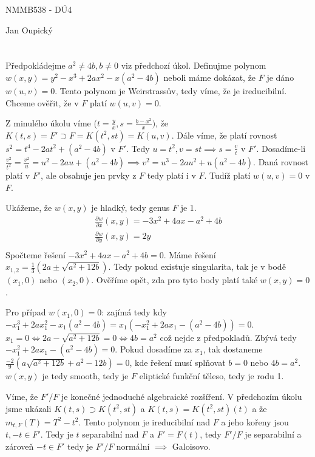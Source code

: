 \documentclass[12pt, a4paper]{article}
\begin{document}
\begin{center}
\large NMMB538 - DÚ4

\normalsize Jan Oupický
\end{center}
\vspace{1\baselineskip}

\section{}
Předpokládejme $a^2 \neq 4b, b \neq 0$ viz předchozí úkol. Definujme polynom $w(x,y) = y^2 - x^3 + 2ax^2 - x(a^2-4b)$ neboli máme dokázat, že $F$ je dáno $w(u,v)=0$. Tento polynom je Weirstrassův, tedy víme, že je ireducibilní. Chceme ověřit, že v $F$ platí $w(u,v)=0$.

Z minulého úkolu víme ($t=\frac{y}{x}, s=\frac{b-x^2}{x})$, že $K(t,s)=F' \supset F = K(t^2, st) = K(u,v)$. Dále víme, že platí rovnost $s^2 = t^4 - 2at^2 + (a^2-4b)$ v $F'$. Tedy $u = t^2, v = st \implies s = \frac{v}{t}$ v $F'$. Dosadíme-li $\frac{v^2}{t^2}=\frac{v^2}{u} = u^2-2au+(a^2-4b) \implies v^2 = u^3-2au^2+u(a^2-4b)$. Daná rovnost platí v $F'$, ale obsahuje jen prvky z $F$ tedy platí i v $F$. Tudíž platí $w(u,v)=0$ v $F$.

Ukážeme, že $w(x,y)$ je hladký, tedy genus $F$ je 1.
\begin{gather*}
\frac{\partial w}{\partial x} (x,y) = -3x^2 + 4ax - a^2 + 4b\\
\frac{\partial w}{\partial y} (x,y) = 2y\\
\end{gather*}
Spočteme řešení $-3x^2 + 4ax - a^2 + 4b = 0$. Máme řešení $x_{1,2} = \frac{1}{3}(2a\pm \sqrt{a^2+12b})$. Tedy pokud existuje singularita, tak je v bodě $(x_1, 0)$ nebo $(x_2, 0)$. Ověříme opět, zda pro tyto body platí také $w(x,y)=0$. 

Pro případ $w(x_1,0) = 0$: zajímá tedy kdy $- x_1^3 + 2ax_1^2 - x_1(a^2-4b) = x_1(- x_1^2 + 2ax_1 -(a^2-4b)) = 0$. $x_1 = 0 \iff 2a - \sqrt{a^2+12b} = 0 \iff 4b = a^2$ což nejde z předpokladů. Zbývá tedy $- x_1^2 + 2ax_1 -(a^2-4b) = 0$. Pokud dosadíme za $x_1$, tak dostaneme $\frac{-2}{9}\left(a \sqrt{a^2+12 b}+a^2-12 b\right) = 0$, kde řešení musí splňovat $b=0$ nebo $4b = a^2$.
$w(x,y)$ je tedy smooth, tedy je $F$ eliptické funkční těleso, tedy je rodu 1.

Víme, že $F'/F$ je konečné jednoduché algebraické rozšíření. V předchozím úkolu jsme ukázali $K(t,s)\supset K(t^2,st)$ a $K(t,s)=K(t^2,st)(t)$ a že $m_{t,F}(T)=T^2-t^2$. Tento polynom je ireducibilní nad $F$ a jeho kořeny jsou $t,-t \in F'$. Tedy je $t$ separabilní nad $F$ a $F'=F(t)$, tedy $F'/F$ je separabilní a zároveň $-t \in F'$ tedy je $F'/F$ normální $\implies$ Galoisovo.
\end{document}
